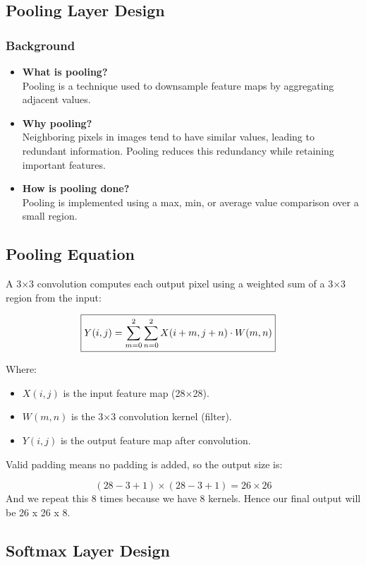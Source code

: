 \documentclass{article}
\begin{document}
\subsection{Pooling Layer Design}
\subsubsection{Background}
\begin{itemize}
  \item \textbf{What is pooling?} \\
    Pooling is a technique used to downsample feature maps by aggregating adjacent values.
  \item \textbf{Why pooling?} \\
    Neighboring pixels in images tend to have similar values, leading to redundant information. Pooling reduces this redundancy while retaining important features.
  \item \textbf{How is pooling done?} \\
    Pooling is implemented using a max, min, or average value comparison over a small region.
\end{itemize}

\subsection{Pooling Equation}
A 3×3 convolution computes each output pixel using a weighted sum of a 3×3 region from the input:

\begin{align*}
  \Aboxed{ Y(i, j) &= \sum_{m=0}^{2} \sum_{n=0}^{2} X(i+m, j+n) \cdot W(m, n)}
\end{align*}

Where:
\begin{itemize}
  \item \( X(i, j) \) is the input feature map (28×28).
  \item \( W(m, n) \) is the 3×3 convolution kernel (filter).
  \item \( Y(i, j) \) is the output feature map after convolution.
\end{itemize}

Valid padding means no padding is added, so the output size is:

\[
(28-3+1) \times (28-3+1) = 26 \times 26
\]
And we repeat this 8 times because we have 8 kernels. Hence our final output will be 26 x 26 x 8.

\subsection{Softmax Layer Design}
\end{document}
